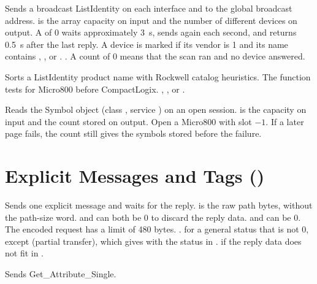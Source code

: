 Sends a broadcast ListIdentity on each interface and to the global broadcast
address.  is the array capacity on input and the number of
different devices on output. A  of 0 waits approximately
3~s, sends again each second, and returns 0.5~s after the last reply. A
device is marked  if its vendor is 1 and its name contains
, , or .
\ret {}. A count of 0 means that the scan ran and no device
answered.

Sorts a ListIdentity product name with Rockwell catalog heuristics. The
function tests for Micro800 before CompactLogix.
\ret {}, , or
.

Reads the Symbol object (class , service ) on an open session.
 is the capacity on input and the count stored on output.
Open a Micro800 with slot $-1$. If a later page fails, the count still gives
the symbols stored before the failure.

\section{Explicit Messages and Tags ()}

Sends one explicit message and waits for the reply.  is the raw
path bytes, without the path-size word.  and
 can both be 0 to discard the reply data.
 and  can be 0. The encoded request has
a limit of 480 bytes.
\ret {}.  for a general status that is not 0,
except  (partial transfer), which gives  with the status
in .  if the reply data does not fit
in .

Sends Get\_Attribute\_Single.

